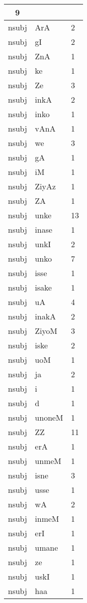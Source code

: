 \documentclass[a4 paper]{article}
\begin{document}
\begin{longtable}{cp{}p{}}
9\\ \midrule nsubj & ArA & 2\\ \midrule nsubj & gI & 2\\ \midrule nsubj & ZnA & 1\\ \midrule nsubj & ke & 1\\ \midrule nsubj & Ze & 3\\ \midrule nsubj & inkA & 2\\ \midrule nsubj & inko & 1\\ \midrule nsubj & vAnA & 1\\ \midrule nsubj & we & 3\\ \midrule nsubj & gA & 1\\ \midrule nsubj & iM & 1\\ \midrule nsubj & ZiyAz & 1\\ \midrule nsubj & ZA & 1\\ \midrule nsubj & unke & 13\\ \midrule nsubj & inase & 1\\ \midrule nsubj & unkI & 2\\ \midrule nsubj & unko & 7\\ \midrule nsubj & isse & 1\\ \midrule nsubj & isake & 1\\ \midrule nsubj & uA & 4\\ \midrule nsubj & inakA & 2\\ \midrule nsubj & ZiyoM & 3\\ \midrule nsubj & iske & 2\\ \midrule nsubj & uoM & 1\\ \midrule nsubj & ja & 2\\ \midrule nsubj & i & 1\\ \midrule nsubj & d & 1\\ \midrule nsubj & unoneM & 1\\ \midrule nsubj & ZZ & 11\\ \midrule nsubj & erA & 1\\ \midrule nsubj & unmeM & 1\\ \midrule nsubj & isne & 3\\ \midrule nsubj & usse & 1\\ \midrule nsubj & wA & 2\\ \midrule nsubj & inmeM & 1\\ \midrule nsubj & erI & 1\\ \midrule nsubj & umane & 1\\ \midrule nsubj & ze & 1\\ \midrule nsubj & uskI & 1\\ \midrule nsubj & haa & 1\\ \midrule 

\end{longtable}
\end{document}
